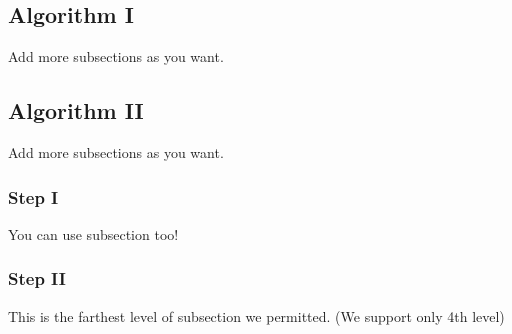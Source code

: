     \subsection{Algorithm I}
    Add more subsections as you want.
    \subsection{Algorithm II}
        Add more subsections as you want.
        \subsubsection{Step I}
            You can use subsection too!
        \subsubsection{Step II}
            This is the farthest level of subsection we permitted. (We support only 4th level)


\pagebreak